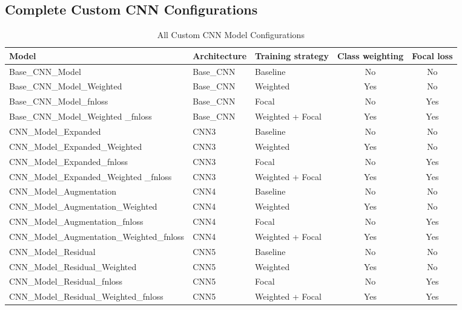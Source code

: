 \documentclass[12pt, a4paper]{report}
\let\oldsubsection\subsection
\renewcommand{\subsection}{%
    \Needspace{6\baselineskip}%
    \oldsubsection
}
\begin{document}
			\begin{landscape}
				\subsection{Complete Custom CNN Configurations}
					\begin{table}[H]
						\centering
						\caption{All Custom CNN Model Configurations}
						\label{tab:all_cnn_configurations}
						\begin{tabularx}{\linewidth}{lXXcc}
							\toprule
							Model & Architecture & Training strategy & Class weighting & Focal loss \\	
							\midrule
							Base\_CNN\_Model & Base\_CNN & Baseline & No & No \\
							Base\_CNN\_Model\_Weighted & Base\_CNN & Weighted & Yes & No \\
							Base\_CNN\_Model\_fnloss & Base\_CNN & Focal & No & Yes \\
							Base\_CNN\_Model\_Weighted \_fnloss & Base\_CNN & Weighted + Focal & Yes & Yes \\
							CNN\_Model\_Expanded & CNN3 & Baseline & No & No \\
							CNN\_Model\_Expanded\_Weighted & CNN3 & Weighted & Yes & No \\
							CNN\_Model\_Expanded\_fnloss & CNN3 & Focal & No & Yes \\
							CNN\_Model\_Expanded\_Weighted \_fnloss & CNN3 & Weighted + Focal & Yes & Yes \\
							CNN\_Model\_Augmentation & CNN4 & Baseline & No & No \\
							CNN\_Model\_Augmentation\_Weighted & CNN4 & Weighted & Yes & No \\
							CNN\_Model\_Augmentation\_fnloss & CNN4 & Focal & No & Yes \\
							CNN\_Model\_Augmentation\_Weighted\_fnloss & CNN4 & Weighted + Focal & Yes & Yes \\
							CNN\_Model\_Residual & CNN5 & Baseline & No & No \\
							CNN\_Model\_Residual\_Weighted & CNN5 & Weighted & Yes & No \\
							CNN\_Model\_Residual\_fnloss & CNN5 & Focal & No & Yes \\
							CNN\_Model\_Residual\_Weighted\_fnloss & CNN5 & Weighted + Focal & Yes & Yes \\
							\bottomrule
						\end{tabularx}
					\end{table}
			\end{landscape}
		
\end{document}
